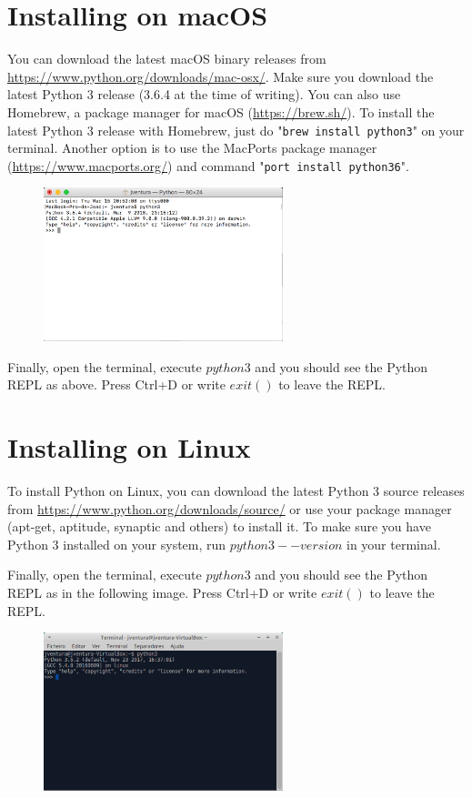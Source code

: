 \section{Installing on macOS}

You can download the latest macOS binary releases from \url{https://www.python.org/downloads/mac-osx/}. Make sure you download the latest Python 3 release (3.6.4 at the time of writing). You can also use Homebrew, a package manager for macOS (\url{https://brew.sh/}). To install the latest Python 3 release with Homebrew, just do "\texttt{brew install python3}" on your terminal. Another option is to use the MacPorts package manager (\url{https://www.macports.org/}) and command "\texttt{port install python36}".  


\begin{figure}[H]
	\centering
  	\includegraphics[width=0.62\textwidth]{images/python_macos.png}
\end{figure}

Finally, open the terminal, execute $python3$ and you should see the Python REPL as above. Press Ctrl+D or write $exit()$ to leave the REPL.

\section{Installing on Linux}

To install Python on Linux, you can download the latest Python 3 source releases from \url{https://www.python.org/downloads/source/} or use your package manager (apt-get, aptitude, synaptic and others) to install it. To make sure you have Python 3 installed on your system, run $python3 --version$ in your terminal.

Finally, open the terminal, execute $python3$ and you should see the Python REPL as in the following image. Press Ctrl+D or write $exit()$ to leave the REPL.

\begin{figure}[H]
	\centering
  	\includegraphics[width=0.62\textwidth]{images/python_linux.png}
\end{figure}
